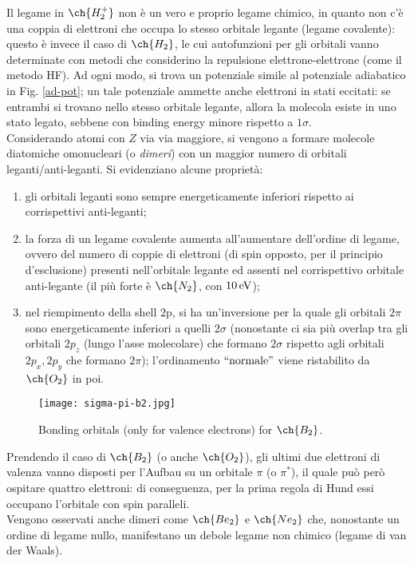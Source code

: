 Il legame in $ \ch{H_2^+} $ non è un vero e proprio legame chimico, in quanto non c'è una coppia di elettroni che occupa lo stesso orbitale legante (legame covalente): questo è invece il caso di $ \ch{H_2} $, le cui autofunzioni per gli orbitali vanno determinate con metodi che considerino la repulsione elettrone-elettrone (come il metodo HF). Ad ogni modo, si trova un potenziale simile al potenziale adiabatico in Fig. \ref{ad-pot}; un tale potenziale ammette anche elettroni in stati eccitati: se entrambi si trovano nello stesso orbitale legante, allora la molecola esiste in uno stato legato, sebbene con binding energy minore rispetto a $ 1\sigma $. \\
Considerando atomi con $ Z $ via via maggiore, si vengono a formare molecole diatomiche omonucleari (o \textit{dimeri}) con un maggior numero di orbitali leganti/anti-leganti. Si evidenziano alcune proprietà:
\begin{enumerate}
	\item gli orbitali leganti sono sempre energeticamente inferiori rispetto ai corrispettivi anti-leganti;
	\item la forza di un legame covalente aumenta all'aumentare dell'ordine di legame, ovvero del numero di coppie di elettroni (di spin opposto, per il principio d'esclusione\footnotemark) presenti nell'orbitale legante ed assenti nel corrispettivo orbitale anti-legante (il più forte è $ \ch{N_2} $, con $ 10\,\mathrm{eV} $);
	\item nel riempimento della shell $ \text{2p} $, si ha un'inversione per la quale gli orbitali $ 2\pi $ sono energeticamente inferiori a quelli $ 2\sigma $ (nonostante ci sia più overlap tra gli orbitali $ 2p_z $ (lungo l'asse molecolare) che formano $ 2\sigma $ rispetto agli orbitali $ 2p_x , 2p_y $ che formano $ 2\pi $); l'ordinamento $ ``\text{normale}" $ viene ristabilito da $ \ch{O_2} $ in poi.
\end{enumerate}


\begin{figure}
	\centering
	\texttt{[image: sigma-pi-b2.jpg]}
	\caption{Bonding orbitals (only for valence electrons) for $ \ch{B_2} $.}
	\label{bond-b2}
\end{figure}

Prendendo il caso di $ \ch{B_2} $ (o anche $ \ch{O_2} $), gli ultimi due elettroni di valenza vanno disposti per l'Aufbau su un orbitale $ \pi $ (o $ \pi^* $), il quale può però ospitare quattro elettroni: di conseguenza, per la prima regola di Hund essi occupano l'orbitale con spin paralleli. \\
Vengono osservati anche dimeri come $ \ch{Be_2} $ e $ \ch{Ne_2} $ che, nonostante un ordine di legame nullo, manifestano un debole legame non chimico (legame di van der Waals).

